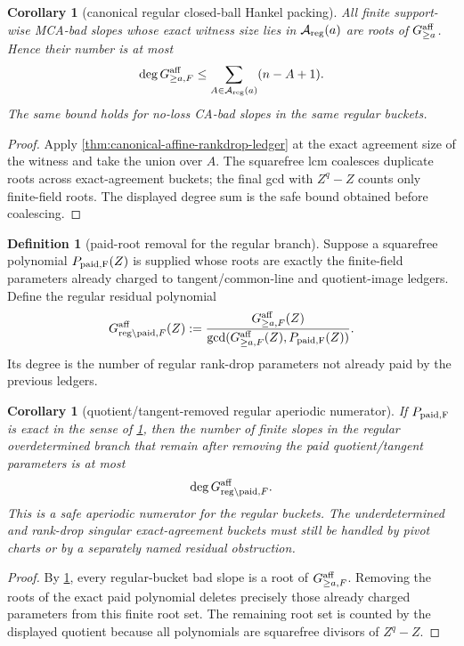 \documentclass[11pt]{article}
\newtheorem{corollary}[theorem]{Corollary}
\theoremstyle{definition}
\newtheorem{definition}[theorem]{Definition}
\theoremstyle{remark}
\begin{document}
\begin{corollary}[canonical regular closed-ball Hankel packing]
\label{cor:canonical-regular-closed-ball-hankel-packing}
All finite support-wise MCA-bad slopes whose exact witness size lies in
$\mathcal A_{\rm reg}(a)$ are roots of $G_{\ge a}^{\rm aff}$.  Hence their number
is at most
\[
        \deg G_{\ge a,F}^{\rm aff}
        \le \sum_{A\in\mathcal A_{\rm reg}(a)}(n-A+1).
\]
The same bound holds for no-loss CA-bad slopes in the same regular buckets.
\end{corollary}

\begin{proof}
Apply \cref{thm:canonical-affine-rankdrop-ledger} at the exact agreement size of
the witness and take the union over $A$.  The squarefree lcm coalesces duplicate
roots across exact-agreement buckets; the final gcd with $Z^q-Z$ counts only
finite-field roots.  The displayed degree sum is the safe bound obtained before
coalescing.
\end{proof}

\begin{definition}[paid-root removal for the regular branch]
\label{def:paid-root-removal-regular-branch}
Suppose a squarefree polynomial $P_{\rm paid,F}(Z)$ is supplied whose roots are
exactly the finite-field parameters already charged to tangent/common-line and
quotient-image ledgers.  Define the regular residual polynomial
\[
        G_{{\rm reg}\setminus{\rm paid},F}^{\rm aff}(Z)
        :=\frac{G_{\ge a,F}^{\rm aff}(Z)}
        {\gcd(G_{\ge a,F}^{\rm aff}(Z),P_{\rm paid,F}(Z))} .
\]
Its degree is the number of regular rank-drop parameters not already paid by the
previous ledgers.
\end{definition}

\begin{corollary}[quotient/tangent-removed regular aperiodic numerator]
\label{cor:quotient-tangent-removed-regular-numerator}
If $P_{\rm paid,F}$ is exact in the sense of
\cref{def:paid-root-removal-regular-branch}, then the number of finite slopes in
the regular overdetermined branch that remain after removing the paid
quotient/tangent parameters is at most
\[
        \deg G_{{\rm reg}\setminus{\rm paid},F}^{\rm aff} .
\]
This is a safe aperiodic numerator for the regular buckets.  The underdetermined
and rank-drop singular exact-agreement buckets must still be handled by pivot
charts or by a separately named residual obstruction.
\end{corollary}

\begin{proof}
By \cref{cor:canonical-regular-closed-ball-hankel-packing}, every regular-bucket
bad slope is a root of $G_{\ge a,F}^{\rm aff}$.  Removing the roots of the exact
paid polynomial deletes precisely those already charged parameters from this
finite root set.  The remaining root set is counted by the displayed quotient
because all polynomials are squarefree divisors of $Z^q-Z$.
\end{proof}
\end{document}
